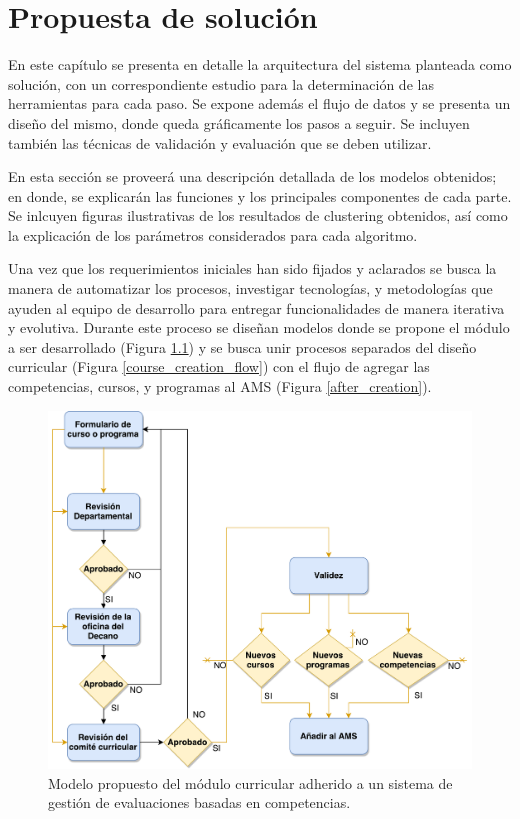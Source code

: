 \chapter{Propuesta de solución} %
En este capítulo se presenta en detalle la arquitectura del sistema planteada como solución, con un correspondiente estudio para la determinación de las herramientas para cada paso. Se expone además el flujo de datos y se presenta un diseño del mismo, donde queda gráficamente los pasos a seguir. Se incluyen también las técnicas de validación y evaluación que se deben utilizar.

\label{capitulo4} %
En esta sección se proveerá una descripción detallada de los modelos obtenidos; en donde, se explicarán las funciones y los principales componentes de cada parte. Se inlcuyen figuras ilustrativas de los resultados de clustering obtenidos, así como la explicación de los parámetros considerados para cada algoritmo.

Una vez que los requerimientos iniciales han sido fijados y aclarados se busca la manera de automatizar los procesos, investigar tecnologías, y metodologías que ayuden al equipo de desarrollo para entregar funcionalidades de manera iterativa y evolutiva. Durante este proceso se diseñan modelos donde se propone el módulo a ser desarrollado (Figura \ref{curriculum_model}) y se busca unir procesos separados del diseño curricular (Figura \ref{course_creation_flow}) con el flujo de agregar las competencias, cursos, y programas al AMS (Figura \ref{after_creation}).

\begin{figure}[]
\centering
\includegraphics[scale=0.5]{Capitulos/PropuestadeSolucion/Imagenes/curriculum_model}
\caption{Modelo propuesto del módulo curricular adherido a un sistema de gestión de evaluaciones basadas en competencias.}
  \label{curriculum_model}
\end{figure}

